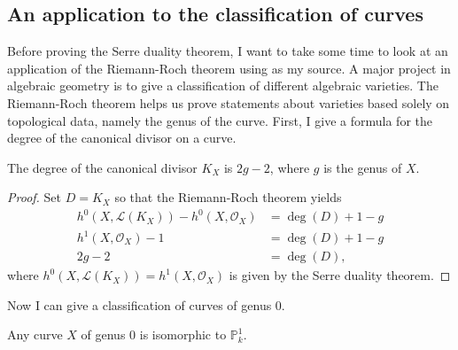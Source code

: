 \subsection{An application to the classification of curves}
Before proving the Serre duality theorem, I want to take some time to
look at an application of the Riemann-Roch theorem using \cite{hartshorne}
as my source. A major project in algebraic geometry is to give a
classification of different algebraic varieties. The Riemann-Roch theorem
helps us prove statements about varieties based solely on topological data,
namely the genus of the curve. First, I give a formula for the degree
of the canonical divisor on a curve.
\begin{lemm}
  The degree of the canonical divisor $K_{X}$ is $2g-2$, where $g$ is the
  genus of $X$.
\end{lemm}
\begin{proof}
  Set $D=K_{X}$ so that the Riemann-Roch theorem yields
  \begin{align*}
    h^{0}(X,\mathcal{L}(K_{X}))-h^{0}(X,\mathscr{O}_{X})&=\deg(D)+1-g \\
    h^{1}(X,\mathscr{O}_{X})-1&=\deg(D)+1-g \\
    2g-2&=\deg(D),
  \end{align*}
  where $h^{0}(X,\mathcal{L}(K_{X}))=h^{1}(X,\mathscr{O}_{X})$ is given
  by the Serre duality theorem.
\end{proof}
Now I can give a classification of curves of genus 0.
\begin{thm}
  Any curve $X$ of genus 0 is isomorphic to $\mathbb{P}^{1}_{k}$.
\end{thm}
